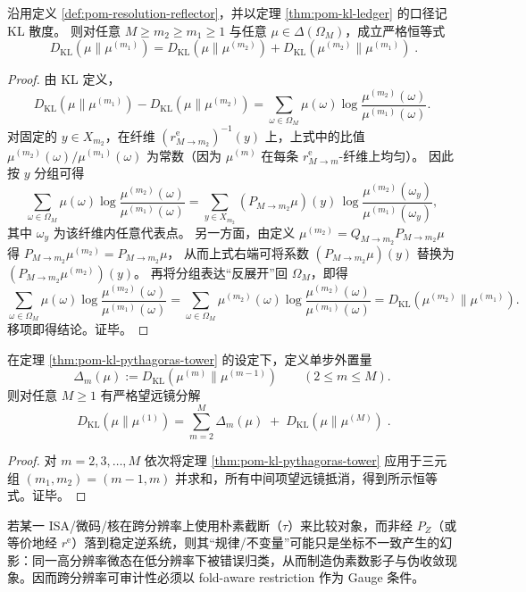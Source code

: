 \begin{theorem}\label{thm:pom-kl-pythagoras-tower}
沿用定义 \ref{def:pom-resolution-reflector}，并以定理 \ref{thm:pom-kl-ledger} 的口径记 KL 散度。
则对任意 $M\ge m_2\ge m_1\ge 1$ 与任意 $\mu\in\Delta(\Omega_M)$，成立严格恒等式
\[
\boxed{\;
D_{\mathrm{KL}}(\mu\|\mu^{(m_1)})
=D_{\mathrm{KL}}(\mu\|\mu^{(m_2)})
+D_{\mathrm{KL}}(\mu^{(m_2)}\|\mu^{(m_1)})\; }.
\]
\end{theorem}
\begin{proof}
由 KL 定义，
\[
D_{\mathrm{KL}}(\mu\|\mu^{(m_1)})-D_{\mathrm{KL}}(\mu\|\mu^{(m_2)})
=\sum_{\omega\in\Omega_M}\mu(\omega)\log\frac{\mu^{(m_2)}(\omega)}{\mu^{(m_1)}(\omega)}.
\]
对固定的 $y\in X_{m_2}$，在纤维 $(r^{\mathrm{e}}_{M\to m_2})^{-1}(y)$ 上，上式中的比值
\(
\mu^{(m_2)}(\omega)/\mu^{(m_1)}(\omega)
\)
为常数（因为 $\mu^{(m)}$ 在每条 $r^{\mathrm{e}}_{M\to m}$-纤维上均匀）。
因此按 $y$ 分组可得
\[
\sum_{\omega\in\Omega_M}\mu(\omega)\log\frac{\mu^{(m_2)}(\omega)}{\mu^{(m_1)}(\omega)}
=\sum_{y\in X_{m_2}}(P_{M\to m_2}\mu)(y)\,
\log\frac{\mu^{(m_2)}(\omega_y)}{\mu^{(m_1)}(\omega_y)},
\]
其中 $\omega_y$ 为该纤维内任意代表点。
另一方面，由定义 \(\mu^{(m_2)}=Q_{M\to m_2}P_{M\to m_2}\mu\) 得
\(
P_{M\to m_2}\mu^{(m_2)}=P_{M\to m_2}\mu
\)，
从而上式右端可将系数 $(P_{M\to m_2}\mu)(y)$ 替换为 $(P_{M\to m_2}\mu^{(m_2)})(y)$。
再将分组表达“反展开”回 $\Omega_M$，即得
\[
\sum_{\omega\in\Omega_M}\mu(\omega)\log\frac{\mu^{(m_2)}(\omega)}{\mu^{(m_1)}(\omega)}
=\sum_{\omega\in\Omega_M}\mu^{(m_2)}(\omega)\log\frac{\mu^{(m_2)}(\omega)}{\mu^{(m_1)}(\omega)}
=D_{\mathrm{KL}}(\mu^{(m_2)}\|\mu^{(m_1)}).
\]
移项即得结论。证毕。
\end{proof}

\begin{corollary}\label{cor:pom-kl-ledger-telescope}
在定理 \ref{thm:pom-kl-pythagoras-tower} 的设定下，定义单步外置量
\[
\Delta_m(\mu):=D_{\mathrm{KL}}(\mu^{(m)}\|\mu^{(m-1)})\qquad(2\le m\le M).
\]
则对任意 $M\ge 1$ 有严格望远镜分解
\[
\boxed{\;
D_{\mathrm{KL}}(\mu\|\mu^{(1)})
=\sum_{m=2}^{M}\Delta_m(\mu)\;+\;D_{\mathrm{KL}}(\mu\|\mu^{(M)})\; }.
\]
\end{corollary}
\begin{proof}
对 $m=2,3,\dots,M$ 依次将定理 \ref{thm:pom-kl-pythagoras-tower} 应用于三元组 $(m_1,m_2)=(m-1,m)$ 并求和，所有中间项望远镜抵消，得到所示恒等式。证毕。
\end{proof}

\begin{remark}\label{rem:pom-gauge-criterion}
若某一 ISA/微码/核在跨分辨率上使用朴素截断（$\tau$）来比较对象，而非经 $P_Z$（或等价地经 $r^{\mathrm{e}}$）落到稳定逆系统，则其“规律/不变量”可能只是坐标不一致产生的幻影：同一高分辨率微态在低分辨率下被错误归类，从而制造伪素数影子与伪收敛现象。因而跨分辨率可审计性必须以 fold-aware restriction 作为 Gauge 条件。
\end{remark}

